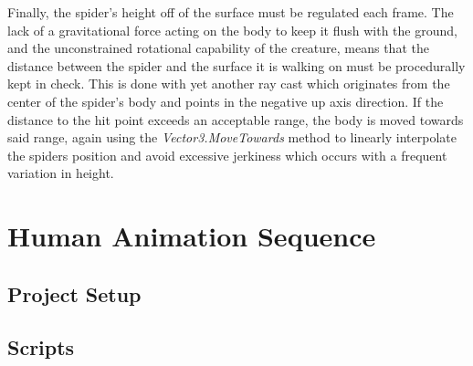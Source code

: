 Finally, the spider's height off of the surface must be regulated each frame.
The lack of a gravitational force acting on the body to keep it flush with the
ground, and the unconstrained rotational capability of the creature, means that
the distance between the spider and the surface it is walking on must be
procedurally kept in check. This is done with yet another ray cast which
originates from the center of the spider's body and points in the negative up
axis direction. If the distance to the hit point exceeds an acceptable range,
the body is moved towards said range, again using the
\textit{Vector3.MoveTowards} method to linearly interpolate the spiders position
and avoid excessive jerkiness which occurs with a frequent variation in height. 



\section{Human Animation Sequence}
\subsection{Project Setup}
\subsection{Scripts}
